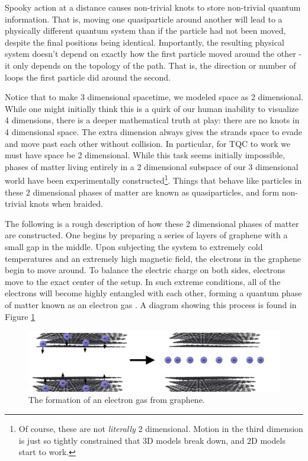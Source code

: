 \documentclass{article}
\theoremstyle{definition}
\numberwithin{figure}{section}
\begin{document}
Spooky action at a distance causes non-trivial knots to store non-trivial quantum information. That is, moving one quasiparticle around another will lead to a physically different quantum system than if the particle had not been moved, despite the final positions being identical. Importantly, the resulting physical system doesn't depend on exactly how the first particle moved around the other - it only depends on the topology of the path. That is, the direction or number of loops the first particle did around the second.

Notice that to make 3 dimensional spacetime, we modeled space as 2 dimensional. While one might initially think this is a quirk of our human inability to visualize 4 dimensions, there is a deeper mathematical truth at play: there are no knots in 4 dimensional space. The extra dimension always gives the strands space to evade and move past each other without collision. In particular, for TQC to work we must have space be 2 dimensional. While this task seems initially impossible, phases of matter living entirely in a 2 dimensional subspace of our 3 dimensional world have been experimentally constructed\footnote{Of course, these are not \textit{literally} 2 dimensional. Motion in the third dimension is just so tightly constrained that $3$D models break down, and $2$D models start to work.}. Things that behave like particles in these 2 dimensional phases of matter are known as quasiparticles, and form non-trivial knots when braided.

The following is a rough description of how these 2 dimensional phases of matter are constructed. One begins by preparing a series of layers of graphene with a small gap in the middle. Upon subjecting the system to extremely cold temperatures and an extremely high magnetic field, the electrons in the graphene begin to move around. To balance the electric charge on both sides, electrons move to the exact center of the setup. In such extreme conditions, all of the electrons will become highly entangled with each other, forming a quantum phase of matter known as an electron gas \cite{yang2021experimental}. A diagram showing this process is found in Figure \ref{fig:spin-liquid}

\begin{figure}
\begin{center}
\includegraphics[scale=0.30]{spin-liquid}
\caption{The formation of an electron gas from graphene.}
\label{fig:spin-liquid}
\end{center}
\end{figure}
\end{document}
